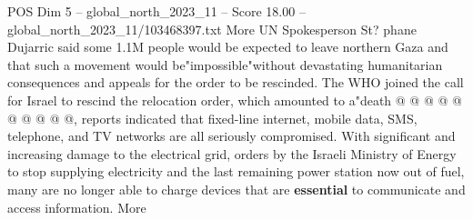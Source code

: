 \begin{textsample}{POS Dim 5 – global\_north\_2023\_11 – Score 18.00 – global\_north\_2023\_11/103468397.txt}
More UN Spokesperson St? phane Dujarric said some 1.1M people would be expected to leave northern Gaza and that such a movement would be"impossible"without devastating humanitarian consequences and appeals for the order to be rescinded.
The WHO joined the call for Israel to rescind the relocation order, which amounted to a"death @ @ @ @ @ @ @ @ @ @, reports indicated that fixed-line internet, mobile data, SMS, telephone, and TV networks are all seriously compromised.
With significant and increasing damage to the electrical grid, orders by the Israeli Ministry of Energy to stop supplying electricity and the last remaining power station now out of fuel, many are no longer able to charge devices that are \textbf{essential} to communicate and access information.
More

\end{textsample}

